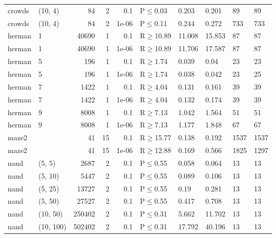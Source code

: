 \begin{longtable}{llrrrlllll}
 crowds        & (10, 4)   &     	84 &   2 & 0.1   & P$\leq$0.03  & 0.203  & 0.201  & 89      & 89      \\
 crowds        & (10, 4)   &     	84 &   2 & 1e-06 & P$\leq$0.11  & 0.244  & 0.272  & 733     & 733     \\
 herman        & 1         &  	40690 &   1 & 0.1   & R$\geq$10.89 & 11.008 & 15.853 & 87      & 87      \\
 herman        & 1         &  	40690 &   1 & 1e-06 & R$\geq$10.89 & 11.706 & 17.587 & 87      & 87      \\
 herman        & 5         &    	196 &   1 & 0.1   & R$\geq$1.74  & 0.039  & 0.04   & 23      & 23      \\
 herman        & 5         &    	196 &   1 & 1e-06 & R$\geq$1.74  & 0.038  & 0.042  & 23      & 25      \\
 herman        & 7         &   	1422 &   1 & 0.1   & R$\geq$4.04  & 0.131  & 0.161  & 39      & 39      \\
 herman        & 7         &   	1422 &   1 & 1e-06 & R$\geq$4.04  & 0.132  & 0.174  & 39      & 39      \\
 herman        & 9         &   	8008 &   1 & 0.1   & R$\geq$7.13  & 1.042  & 1.564  & 51      & 51      \\
 herman        & 9         &   	8008 &   1 & 1e-06 & R$\geq$7.13  & 1.177  & 1.848  & 67      & 67      \\
 maze2         &           &     	41 &  15 & 0.1   & R$\geq$15.77 & 0.138  & 0.192  & 1537    & 1537    \\
 maze2         &           &     	41 &  15 & 1e-06 & R$\geq$12.88 & 0.169  & 0.566  & 1825    & 1297    \\
 nand          & (5, 5)    &   	2687 &   2 & 0.1   & P$\leq$0.55  & 0.058  & 0.064  & 13      & 13      \\
 nand          & (5, 10)   &   	5447 &   2 & 0.1   & P$\leq$0.55  & 0.089  & 0.106  & 13      & 13      \\
 nand          & (5, 25)   &  	13727 &   2 & 0.1   & P$\leq$0.55  & 0.19   & 0.281  & 13      & 13      \\
 nand          & (5, 50)   &  	27527 &   2 & 0.1   & P$\leq$0.55  & 0.417  & 0.708  & 13      & 13      \\
 nand          & (10, 50)  & 	250402 &   2 & 0.1   & P$\leq$0.31  & 5.662  & 11.702 & 13      & 13      \\
 nand          & (10, 100) & 	502402 &   2 & 0.1   & P$\leq$0.31  & 17.792 & 40.196 & 13      & 13      \\

\end{longtable}
